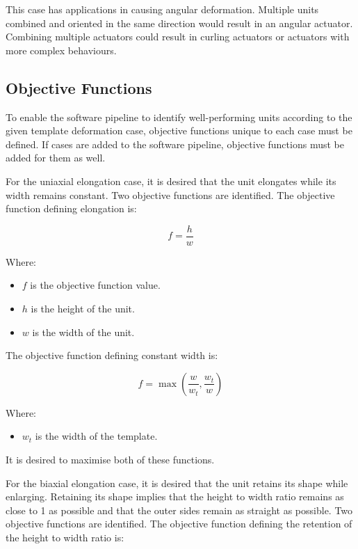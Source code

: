 This case has applications in causing angular deformation. Multiple units combined and oriented in the same direction would result in an angular actuator. Combining multiple actuators could result in curling actuators or actuators with more complex behaviours.

\subsection{Objective Functions}

To enable the software pipeline to identify well-performing units according to the given template deformation case, objective functions unique to each case must be defined. If cases are added to the software pipeline, objective functions must be added for them as well.

For the uniaxial elongation case, it is desired that the unit elongates while its width remains constant. Two objective functions are identified. The objective function defining elongation is:

\begin{equation}
	f=\frac{h}{w}
\end{equation}

Where:

\begin{itemize}
	\item $f$ is the objective function value.
	\item $h$ is the height of the unit.
	\item $w$ is the width of the unit.
\end{itemize}

The objective function defining constant width is:

\begin{equation}
	f=\max\left (\frac{w}{w_{t}},\frac{w_{t}}{w} \right )
\end{equation}

Where:

\begin{itemize}
	\item $w_{t}$ is the width of the template.
\end{itemize}

It is desired to maximise both of these functions.

For the biaxial elongation case, it is desired that the unit retains its shape while enlarging. Retaining its shape implies that the height to width ratio remains as close to 1 as possible and that the outer sides remain as straight as possible. Two objective functions are identified. The objective function defining the retention of the height to width ratio is:

